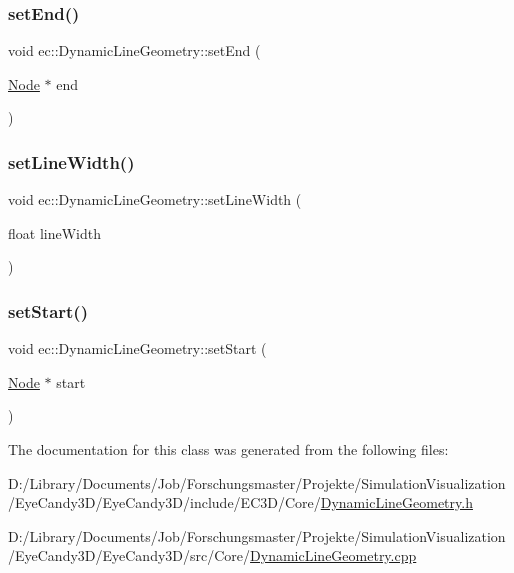 \subsubsection{\texorpdfstring{set\+End()}{setEnd()}}
{\footnotesize\ttfamily void ec\+::\+Dynamic\+Line\+Geometry\+::set\+End (\begin{DoxyParamCaption}\item[{\mbox{\hyperlink{classec_1_1_node}{Node}} $\ast$}]{end }\end{DoxyParamCaption})}

\mbox{\label{classec_1_1_dynamic_line_geometry_ad2a5b06e7ea10c771ed17ff0ffce4b3a}} 
\subsubsection{\texorpdfstring{set\+Line\+Width()}{setLineWidth()}}
{\footnotesize\ttfamily void ec\+::\+Dynamic\+Line\+Geometry\+::set\+Line\+Width (\begin{DoxyParamCaption}\item[{float}]{line\+Width }\end{DoxyParamCaption})}

\mbox{\label{classec_1_1_dynamic_line_geometry_a7354615fc961c1d6d6e9ec09bdb5bdf9}} 
\subsubsection{\texorpdfstring{set\+Start()}{setStart()}}
{\footnotesize\ttfamily void ec\+::\+Dynamic\+Line\+Geometry\+::set\+Start (\begin{DoxyParamCaption}\item[{\mbox{\hyperlink{classec_1_1_node}{Node}} $\ast$}]{start }\end{DoxyParamCaption})}



The documentation for this class was generated from the following files\+:\begin{DoxyCompactItemize}
\item 
D\+:/\+Library/\+Documents/\+Job/\+Forschungsmaster/\+Projekte/\+Simulation\+Visualization/\+Eye\+Candy3\+D/\+Eye\+Candy3\+D/include/\+E\+C3\+D/\+Core/\mbox{\hyperlink{_dynamic_line_geometry_8h}{Dynamic\+Line\+Geometry.\+h}}\item 
D\+:/\+Library/\+Documents/\+Job/\+Forschungsmaster/\+Projekte/\+Simulation\+Visualization/\+Eye\+Candy3\+D/\+Eye\+Candy3\+D/src/\+Core/\mbox{\hyperlink{_dynamic_line_geometry_8cpp}{Dynamic\+Line\+Geometry.\+cpp}}\end{DoxyCompactItemize}
